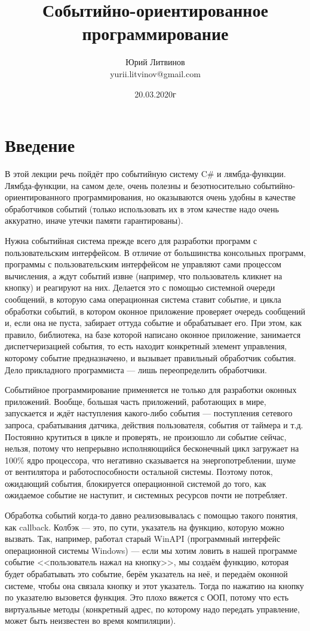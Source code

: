 \documentclass[a5paper]{article}
\title{Событийно-ориентированное программирование}
\author{Юрий Литвинов\\\small{yurii.litvinov@gmail.com}}
\date{20.03.2020г}
\begin{document}
\maketitle
\thispagestyle{empty}

\section{Введение}

В этой лекции речь пойдёт про событийную систему C\# и лямбда-функции. Лямбда-функции, на самом деле, очень полезны и безотносительно событийно-ориентированного программирования, но оказываются очень удобны в качестве обработчиков событий (только использовать их в этом качестве надо очень аккуратно, иначе утечки памяти гарантированы). 

Нужна событийная система прежде всего для разработки программ с пользовательским интерфейсом. В отличие от большинства консольных программ, программы с пользовательским интерфейсом не управляют сами процессом вычисления, а ждут событий извне (например, что пользователь кликнет на кнопку) и реагируют на них. Делается это с помощью системной очереди сообщений, в которую сама операционная система ставит событие, и цикла обработки событий, в котором оконное приложение проверяет очередь сообщений и, если она не пуста, забирает оттуда событие  и обрабатывает его. При этом, как правило, библиотека, на базе которой написано оконное приложение, занимается диспетчеризацией события, то есть находит конкретный элемент управления, которому событие предназначено, и вызывает правильный обработчик события. Дело прикладного программиста --- лишь переопределить обработчики.

Событийное программирование применяется не только для разработки оконных приложений. Вообще, большая часть приложений, работающих в мире, запускается и ждёт наступления какого-либо события --- поступления сетевого запроса, срабатывания датчика, действия пользователя, события от таймера и т.д. Постоянно крутиться в цикле и проверять, не произошло ли событие сейчас, нельзя, потому что непрерывно исполняющийся бесконечный цикл загружает на 100\% ядро процессора, что негативно сказывается на энергопотреблении, шуме от вентилятора и работоспособности остальной системы. Поэтому поток, ожидающий события, блокируется операционной системой до того, как ожидаемое событие не наступит, и системных ресурсов почти не потребляет.

Обработка событий когда-то давно реализовывалась с помощью такого понятия, как callback. Колбэк --- это, по сути, указатель на функцию, которую можно вызвать. Так, например, работал старый WinAPI (программный интерфейс операционной системы Windows) --- если мы хотим ловить в нашей программе событие <<пользователь нажал на кнопку>>, мы создаём функцию, которая будет обрабатывать это событие, берём указатель на неё, и передаём оконной системе, чтобы она связала кнопку и этот указатель. Тогда по нажатию на кнопку по указателю вызовется функция. Это плохо вяжется с ООП, потому что есть виртуальные методы (конкретный адрес, по которому надо передать управление, может быть неизвестен во время компиляции).
\end{document}
